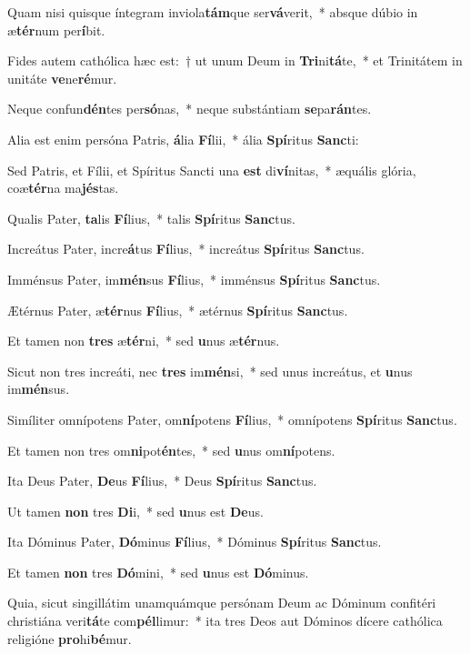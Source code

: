 \item Quam nisi quisque íntegram inviola\textbf{tám}que ser\textbf{vá}verit,~* absque dúbio in æ\textbf{tér}num per\textbf{í}bit.
\item Fides autem cathólica hæc est:~† ut unum Deum in \textbf{Tri}ni\textbf{tá}te,~* et Trinitátem in unitáte \textbf{ve}ne\textbf{ré}mur.
\item Neque confun\textbf{dén}tes per\textbf{só}nas,~* neque substántiam \textbf{se}pa\textbf{rán}tes.
\item Alia est enim persóna Patris, \textbf{á}lia \textbf{Fí}lii,~* ália \textbf{Spí}ritus \textbf{Sanc}ti:
\item Sed Patris, et Fílii, et Spíritus Sancti una \textbf{est} di\textbf{ví}nitas,~* æquális glória, coæ\textbf{tér}na ma\textbf{jés}tas.
\item Qualis Pater, \textbf{ta}lis \textbf{Fí}lius,~* talis \textbf{Spí}ritus \textbf{Sanc}tus.
\item Increátus Pater, incre\textbf{á}tus \textbf{Fí}lius,~* increátus \textbf{Spí}ritus \textbf{Sanc}tus.
\item Imménsus Pater, im\textbf{mén}sus \textbf{Fí}lius,~* imménsus \textbf{Spí}ritus \textbf{Sanc}tus.
\item Ætérnus Pater, æ\textbf{tér}nus \textbf{Fí}lius,~* ætérnus \textbf{Spí}ritus \textbf{Sanc}tus.
\item Et tamen non \textbf{tres} æ\textbf{tér}ni,~* sed \textbf{u}nus æ\textbf{tér}nus.
\item Sicut non tres increáti, nec \textbf{tres} im\textbf{mén}si,~* sed unus increátus, et \textbf{u}nus im\textbf{mén}sus.
\item Simíliter omnípotens Pater, om\textbf{ní}potens \textbf{Fí}lius,~* omnípotens \textbf{Spí}ritus \textbf{Sanc}tus.
\item Et tamen non tres om\textbf{ni}pot\textbf{én}tes,~* sed \textbf{u}nus om\textbf{ní}potens.
\item Ita Deus Pater, \textbf{De}us \textbf{Fí}lius,~* Deus \textbf{Spí}ritus \textbf{Sanc}tus.
\item Ut tamen \textbf{non} tres \textbf{Di}i,~* sed \textbf{u}nus est \textbf{De}us.
\item Ita Dóminus Pater, \textbf{Dó}minus \textbf{Fí}lius,~* Dóminus \textbf{Spí}ritus \textbf{Sanc}tus.
\item Et tamen \textbf{non} tres \textbf{Dó}mini,~* sed \textbf{u}nus est \textbf{Dó}minus.
\item Quia, sicut singillátim unamquámque persónam Deum ac Dóminum confitéri christiána veri\textbf{tá}te com\textbf{pél}limur:~* ita tres Deos aut Dóminos dícere cathólica religióne \textbf{pro}hi\textbf{bé}mur.
